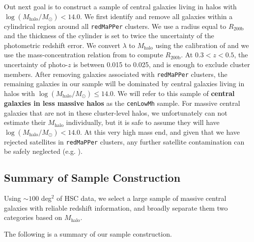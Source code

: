 \documentclass[a4paper,fleqn,usenatbib]{mnras}
\def\redm{\texttt{redMaPPer}}
\def\nbcg{\texttt{cenLowMh}}
\def\mhalo{{$M_{\mathrm{halo}}$}}
\def\logmh{{$\log (M_{\mathrm{halo}}/M_{\odot})$}}
\begin{document}
    Out next goal is to construct a sample of central galaxies living in halos with 
    \logmh{}$<14.0$. 
    We first identify and remove all galaxies within a cylindrical region around all 
    \redm{} clusters. 
    We use a radius equal to $R_{\mathrm{200b}}$ and the thickness of the cylinder is 
    set to twice the uncertainty of the photometric redshift error. 
    We convert $\lambda$ to $M_{\mathrm{halo}}$ using the calibration of 
    \citet{Simet2016} and we use the mass-concentration relation from 
    \citet{Diemer2015} to compute $R_{\mathrm{200b}}$. At $0.3 < z < 0.5$, the 
    uncertainty of photo-$z$ is between 0.015 to 0.025, and is enough to exclude 
    cluster members.
    After removing galaxies associated with \redm{} clusters, the remaining galaxies 
    in our sample will be dominated by central galaxies living in halos with 
    \logmh{}$\leq 14.0$. 
    We will refer to this sample of \textbf{central galaxies in less massive halos}
    as the \nbcg{} sample. For massive central galaxies that are not in these cluster-level halos, 
    we unfortunately can not estimate their \mhalo{} individually, but it is safe 
    to assume they will have $\log (M_{\mathrm{halo}}/M_{\odot}) < 14.0$.  
    At this very high mass end, and given that we have rejected satellites in \redm{} 
    clusters, any further satellite contamination can be safely neglected 
    (e.g. \citealt{Reid2014, Hoshino2015, Saito2016, vanUitert2016}).
    
 

\subsection{Summary of Sample Construction}
    \label{ssec:sample}

    Using ${\sim} 100$ deg$^2$ of HSC data, we select a large sample of massive central 
    galaxies with reliable redshift information, and broadly separate them two 
    categories based on $M_{\mathrm{halo}}$.
    
    The following is a summary of our sample construction.
    
\end{document}
